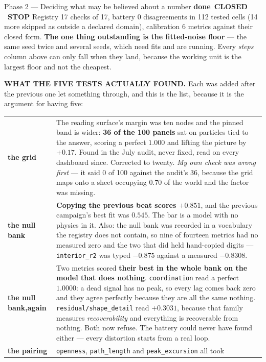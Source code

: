 \documentclass[11pt,a4paper]{article}
\newcommand{\code}[1]{\texttt{#1}}
\newcommand{\dn}{\textcolor{good}{\textbf{done}}}
\newcommand{\stopp}{\textcolor{bad!30!white}{\textbf{STOP}}}
\begin{document}
\begin{phasebox}{Phase 2 --- Deciding what may be believed about a number \hfill \dn\ \textbf{CLOSED} \ \stopp}
\noindent Registry 17 checks of 17, battery 0 disagreements in 112 tested cells (14 more
skipped as outside a declared domain), calibration 6 metrics against
their closed form. \textbf{The one thing outstanding is the fitted-noise floor} --- the same seed
twice and several seeds, which need fits and are running. Every \emph{steps} column above can only
fall when they land, because the working unit is the largest floor and not the cheapest.

\medskip
\textbf{WHAT THE FIVE TESTS ACTUALLY FOUND.} Each was added after the previous one let something
through, and this is the list, because it is the argument for having five:

\begin{center}\footnotesize
\begin{tabular}{@{}l p{10.2cm}@{}}
\toprule
\textbf{the grid} & The reading surface's margin was ten nodes and the pinned band is wider:
\textbf{36 of the 100 panels} sat on particles tied to the answer, scoring a perfect $1.000$ and
lifting the picture by $+0.17$. Found in the July audit, never fixed, read on every dashboard since.
Corrected to twenty. \emph{My own check was wrong first} --- it said 0 of 100 against the audit's 36,
because the grid maps onto a sheet occupying $0.70$ of the world and the factor was missing.\\
\addlinespace
\textbf{the null bank} & \textbf{Copying the previous beat scores $+0.851$}, and the previous
campaign's best fit was $0.545$. The bar is a model with no physics in it. Also: the null bank was
recorded in a vocabulary the registry does not contain, so nine of fourteen metrics had no measured
zero and the two that did held hand-copied digits --- \code{interior\_r2} was typed $-0.875$ against
a measured $-0.8308$.\\
\addlinespace
\textbf{the null bank,\newline again} & Two metrics scored \textbf{their best in the whole bank on
the model that does nothing}. \code{coordination} read a perfect $1.0000$: a dead signal has no peak,
so every lag comes back zero and they agree perfectly because they are all the same nothing.
\code{residual/shape\_detail} read $+0.3031$, because that family measures \emph{recoverability} and
everything is recoverable from nothing. Both now refuse. The battery could never have found either
--- every distortion starts from a real loop.\\
\addlinespace
\textbf{the pairing} & \code{openness}, \code{path\_length} and \code{peak\_excursion} all took

\end{tabular}
\end{center}
\end{phasebox}
\end{document}
